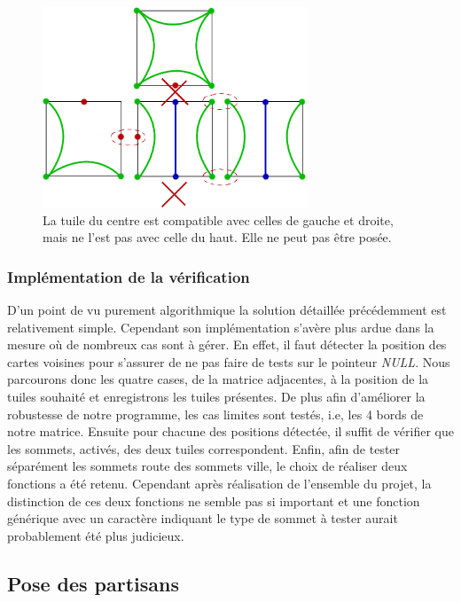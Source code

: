 \documentclass[a4paper, 11pt]{article}
\begin{document}
        \begin{figure}[H]
              \centering
        	  \includegraphics[width=0.7\textwidth]{img/pose-impossible.png}
			  \caption{La tuile du centre est compatible avec celles de gauche et droite, mais ne l'est pas avec celle du haut. Elle ne peut pas être posée.}
			  \label{fig:compatibilite-sommets}
		\end{figure}

		\subsubsection{Implémentation de la vérification}\label{sec:pose-tuile-c}
			\indent D'un point de vu purement algorithmique la solution détaillée précédemment est relativement simple. Cependant son implémentation s'avère plus ardue dans la mesure où de nombreux cas sont à gérer. En effet, il faut détecter la position des cartes voisines pour s'assurer de ne pas faire de tests sur le pointeur \emph{NULL}. Nous parcourons donc les quatre cases, de la matrice adjacentes, à la position de la tuiles souhaité et enregistrons les tuiles présentes. De plus afin d'améliorer la robustesse de notre programme, les cas limites sont testés, i.e, les 4 bords de notre matrice. Ensuite pour chacune des positions détectée, il suffit de vérifier que les sommets, activés, des deux tuiles correspondent. Enfin, afin de tester séparément les sommets route des sommets ville, le choix de réaliser deux fonctions a été retenu. Cependant après réalisation de l'ensemble du projet, la distinction de ces deux fonctions ne semble pas si important et une fonction générique avec un caractère indiquant le type de sommet à tester aurait probablement été plus judicieux. 


	\subsection{Pose des partisans}\label{sec:pose-partisan}
\end{document}
